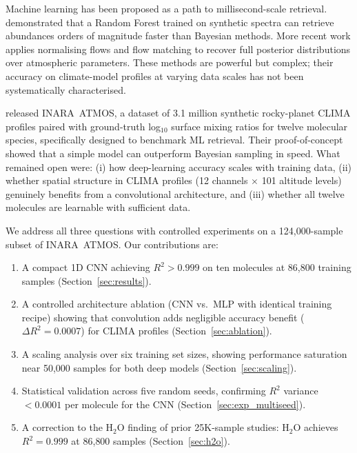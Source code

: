 \documentclass[11pt]{article}
\begin{document}
Machine learning has been proposed as a path to millisecond-scale retrieval.
\citet{marquez2018} demonstrated that a Random Forest trained on synthetic
spectra can retrieve abundances orders of magnitude faster than Bayesian methods.
More recent work applies normalising flows \citep{vasist2023} and flow matching
\citep{gebhard2024} to recover full posterior distributions over atmospheric
parameters. These methods are powerful but complex; their accuracy on
climate-model profiles at varying data scales has not been systematically
characterised.

\citet{zorzan2025} released INARA~ATMOS, a dataset of 3.1 million synthetic
rocky-planet CLIMA profiles \citep{arney2016} paired with ground-truth
log$_{10}$ surface mixing ratios for twelve molecular species, specifically
designed to benchmark ML retrieval. Their proof-of-concept showed that
a simple model can outperform Bayesian sampling in speed. What remained open
were: (i) how deep-learning accuracy scales with training data, (ii) whether
spatial structure in CLIMA profiles (12 channels $\times$ 101 altitude levels)
genuinely benefits from a convolutional architecture, and (iii) whether
all twelve molecules are learnable with sufficient data.

We address all three questions with controlled experiments on a 124{,}000-sample
subset of INARA~ATMOS. Our contributions are:

\begin{enumerate}
  \item A compact 1D CNN achieving $R^2 > 0.999$ on ten molecules at 86{,}800
        training samples (Section~\ref{sec:results}).
  \item A controlled architecture ablation (CNN vs.\ MLP with identical training
        recipe) showing that convolution adds negligible accuracy benefit
        ($\Delta R^2 = 0.0007$) for CLIMA profiles (Section~\ref{sec:ablation}).
  \item A scaling analysis over six training set sizes, showing performance
        saturation near 50{,}000 samples for both deep models
        (Section~\ref{sec:scaling}).
  \item Statistical validation across five random seeds, confirming $R^2$
        variance $< 0.0001$ per molecule for the CNN
        (Section~\ref{sec:exp_multiseed}).
  \item A correction to the H$_2$O finding of prior 25K-sample studies:
        H$_2$O achieves $R^2 = 0.999$ at 86{,}800 samples
        (Section~\ref{sec:h2o}).
\end{enumerate}
\end{document}
